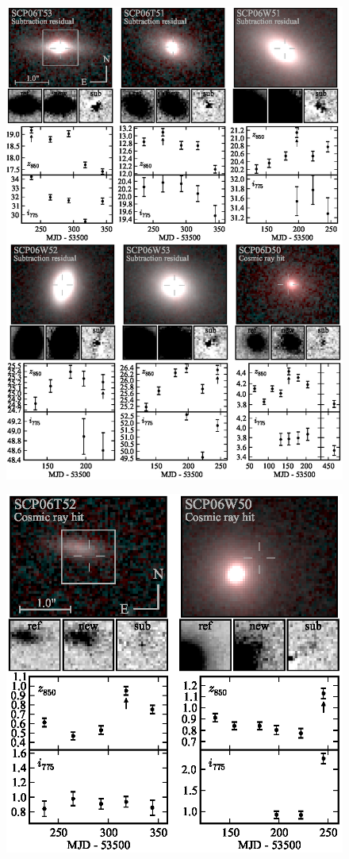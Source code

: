 \begin{figure}[p]
\includegraphics[width=\textwidth]{figures/cands/artifacts3.eps}
\end{figure}

\begin{figure}[t]
\includegraphics[width=\textwidth]{figures/cands/artifacts4.eps}
\end{figure}

